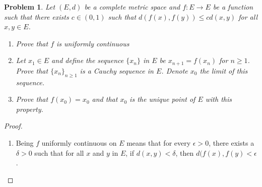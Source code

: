 \documentclass[11pt]{article}
\newtheorem{problem}{Problem}
\newtheorem{proof}{Proof}
\begin{document}
\pagebreak
\begin{problem}
Let $(E, d)$ be a complete metric space and $f:E\rightarrow E$ be a function such that there exists $c\in (0,1)$ such that $d(f(x),f(y))\leq cd(x,y)$ for all $x,y\in E$.
\begin{enumerate}
	\item Prove that $f$ is uniformly continuous
	\item Let $x_1 \in E$ and define the sequence $\{x_n\}$ in $E$ be $x_{n+1}=f(x_n)$ for $n\geq 1$. Prove that $\{x_n\}_{n\geq 1}$ is a Cauchy sequence in $E$. Denote $x_0$ the limit of this sequence.
	\item Prove that $f(x_0)=x_0$ and that $x_0$ is the unique point of $E$ with this property.
\end{enumerate}
\end{problem}
\begin{proof}
\begin{enumerate}
\item Being $f$ uniformly continuous on $E$ means that for every $\epsilon > 0$, there exists a $\delta > 0$ such that for all $x$ and $y$ in $E$, if $d(x,y)<\delta$, then $d(f(x), f(y)<\epsilon$. 
		

\end{enumerate}
\end{proof}
\end{document}

